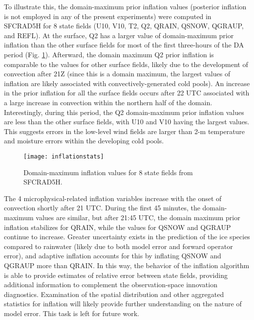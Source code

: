 To illustrate this, the domain-maximum prior inflation values (posterior inflation is not employed in any of the present experiments) were computed in SFCRAD5H for 8 state fields (U10, V10, T2, Q2, QRAIN, QSNOW, QGRAUP, and REFL). At the surface, Q2 has a larger value of domain-maximum prior inflation than the other surface fields for most of the first three-hours of the DA period (Fig. \ref{infstats}). Afterward, the domain maximum Q2 prior inflation is comparable to the values for other surface fields, likely due to the development of convection after 21Z (since this is a domain maximum, the largest values of inflation are likely associated with convectively-generated cold pools). An increase in the prior inflation for all the surface fields occurs after 22 UTC associated with a large increase in convection within the northern half of the domain. Interestingly, during this period, the Q2 domain-maximum prior inflation values are less than the other surface fields, with U10 and V10 having the largest values. This suggests errors in the low-level wind fields are larger than 2-m temperature and moisture errors within the developing cold pools.

\begin{figure}
\centering
\texttt{[image: inflationstats]}
\caption{Domain-maximum inflation values for 8 state fields from SFCRAD5H.}
\label{infstats}
\end{figure}

The 4 microphysical-related inflation variables increase with the onset of convection shortly after 21 UTC. During the first 45 minutes, the domain-maximum values are similar, but after 21:45 UTC, the domain maximum prior inflation stabilizes for QRAIN, while the values for QSNOW and QGRAUP continue to increase. Greater uncertainty exists in the prediction of the ice species compared to rainwater (likely due to both model error and forward operator error), and adaptive inflation accounts for this by inflating QSNOW and QGRAUP more than QRAIN. In this way, the behavior of the inflation algorithm is able to provide estimates of relative error between state fields, providing additional information to complement the observation-space innovation diagnostics. Examination of the spatial distribution and other aggregated statistics for inflation will likely provide further understanding on the nature of model error. This task is left for future work.

